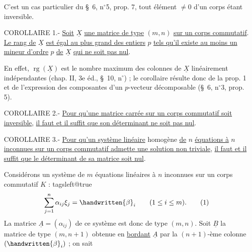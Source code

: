 C'est un cas particulier du \S~6, n$^\circ$5, prop. 7, tout élément $\ne0$ d'un corps étant inversible.

COROLLAIRE 1.- \uline{Soit} $\underline X$ \uline{une matrice de type} $(m,n)$ \uline{sur un corps commutatif}. \uline{Le rang de} $\underline X$ \uline{est égal au plus grand des entiers} $p$ \uline{tels qu'il existe au moins un mineur d'ordre} $p$ \uline{de} $\underline X$ \uline{qui ne soit pas nul}.

En effet, $\operatorname{rg}(\underline X)$ est le nombre maximum des colonnes de $\underline X$ linéairement indépendantes (chap. II, 3e éd., \S~10, n$^\circ$\quad) ; le corollaire résulte donc de la prop. 1 et de l'expression des composantes d'un $p$-vecteur décomposable (\S~6, n$^\circ$3, prop. 5).

COROLLAIRE 2.- \uline{Pour qu'une matrice carrée sur un corps commutatif soit inversible}, \uline{il faut et il suffit que son déterminant ne soit pas nul}.

COROLLAIRE 3.- \uline{Pour qu'un système linéaire} homogène \uline{de} $n$ \uline{équations à} $n$ \uline{inconnues sur un corps commutatif admette une solution non triviale}, \uline{il faut et il suffit que le déterminant de sa matrice soit nul}.

Considérons un système de $m$ équations linéaires à $n$ inconnues sur un corps commutatif $K$ :
{\csname tagsleft@true\endcsname
\[
 \sum_{j=1}^{n}\alpha_{ij}\xi_j=\handwritten{\beta}_i\qquad (1\leq i\leq m).\tag*{(1)}
\]
}
La matrice $\underline A=(\alpha_{ij})$ de ce système est donc de type $(m,n)$. Soit $\underline B$ la matrice de type $(m,n+1)$ obtenue en \uline{bordant} $\underline A$ par la $(n+1)$-ème colonne $(\handwritten{\beta}_i)$ ; on sait
